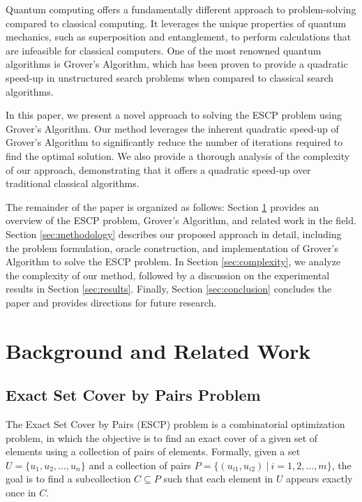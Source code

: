 Quantum computing offers a fundamentally different approach to problem-solving compared to classical computing. It leverages the unique properties of quantum mechanics, such as superposition and entanglement, to perform calculations that are infeasible for classical computers. One of the most renowned quantum algorithms is Grover's Algorithm, which has been proven to provide a quadratic speed-up in unstructured search problems when compared to classical search algorithms.

In this paper, we present a novel approach to solving the ESCP problem using Grover's Algorithm. Our method leverages the inherent quadratic speed-up of Grover's Algorithm to significantly reduce the number of iterations required to find the optimal solution. We also provide a thorough analysis of the complexity of our approach, demonstrating that it offers a quadratic speed-up over traditional classical algorithms.

The remainder of the paper is organized as follows: Section \ref{sec:background} provides an overview of the ESCP problem, Grover's Algorithm, and related work in the field. Section \ref{sec:methodology} describes our proposed approach in detail, including the problem formulation, oracle construction, and implementation of Grover's Algorithm to solve the ESCP problem. In Section \ref{sec:complexity}, we analyze the complexity of our method, followed by a discussion on the experimental results in Section \ref{sec:results}. Finally, Section \ref{sec:conclusion} concludes the paper and provides directions for future research.

\section{Background and Related Work} \label{sec:background}

\subsection{Exact Set Cover by Pairs Problem}

The Exact Set Cover by Pairs (ESCP) problem is a combinatorial optimization problem, in which the objective is to find an exact cover of a given set of elements using a collection of pairs of elements. Formally, given a set $U = \{u_1, u_2, \dots, u_n\}$ and a collection of pairs $P = \{(u_{i1}, u_{i2})\ |\ i = 1, 2, \dots, m\}$, the goal is to find a subcollection $C \subseteq P$ such that each element in $U$ appears exactly once in $C$.

